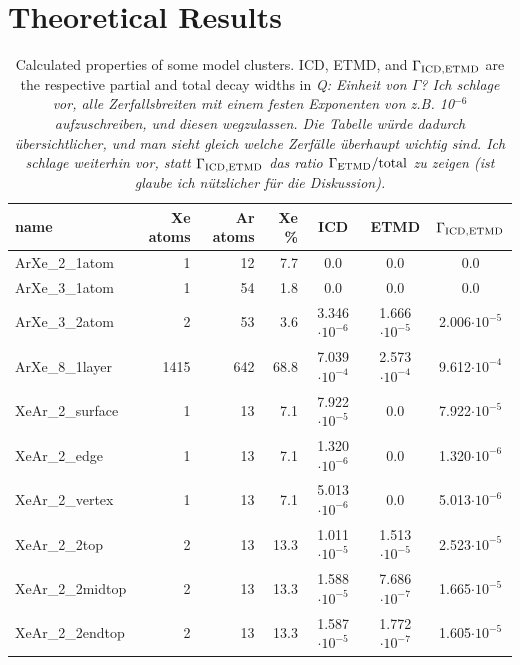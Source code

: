 \section{Theoretical Results}
%
%
\begin{table}[h]
\centering
\caption{Calculated properties of some model clusters. ICD, ETMD, and $\Gamma_{\rm ICD, ETMD}$ are the respective partial and total decay widths in 
{\it Q: Einheit von $\Gamma$? 
Ich schlage vor, alle Zerfallsbreiten mit einem festen Exponenten von z.B. 10$^{-6}$ aufzuschreiben, und diesen wegzulassen. 
Die Tabelle w\"urde dadurch \"ubersichtlicher, und man sieht gleich welche Zerf\"alle \"uberhaupt wichtig sind.
Ich schlage weiterhin vor, statt $\Gamma_{\rm ICD, ETMD}$ das ratio $\Gamma_{\rm ETMD}/\rm total$ zu zeigen (ist glaube ich n\"utzlicher f\"ur die Diskussion).}
}
\begin{tabular}{lrrrccc}
\toprule
name                 & Xe atoms & Ar atoms & Xe \% &   ICD                &  ETMD                & $\Gamma_{\rm ICD,ETMD}$\\
\midrule
ArXe\_2\_1atom       &      1   &     12   &  7.7  &      0.0             &  0.0                 &     0.0            \\
ArXe\_3\_1atom       &      1   &     54   &  1.8  &      0.0             &  0.0                 &     0.0            \\ 
ArXe\_3\_2atom       &      2   &     53   &  3.6  & 3.346$\cdot 10^{-6}$ & 1.666$\cdot 10^{-5}$ & 2.006$\cdot 10^{-5}$ \\
ArXe\_8\_1layer      &   1415   &    642   & 68.8  & 7.039$\cdot 10^{-4}$ & 2.573$\cdot 10^{-4}$ & 9.612$\cdot 10^{-4}$ \\
\midrule
XeAr\_2\_surface     &      1   &     13   &  7.1  & 7.922$\cdot 10^{-5}$ & 0.0                  & 7.922$\cdot 10^{-5}$ \\
XeAr\_2\_edge        &      1   &     13   &  7.1  & 1.320$\cdot 10^{-6}$ & 0.0                  & 1.320$\cdot 10^{-6}$ \\
XeAr\_2\_vertex      &      1   &     13   &  7.1  & 5.013$\cdot 10^{-6}$ & 0.0                  & 5.013$\cdot 10^{-6}$ \\
XeAr\_2\_2top        &      2   &     13   & 13.3  & 1.011$\cdot 10^{-5}$ & 1.513$\cdot 10^{-5}$ & 2.523$\cdot 10^{-5}$ \\
XeAr\_2\_2midtop     &      2   &     13   & 13.3  & 1.588$\cdot 10^{-5}$ & 7.686$\cdot 10^{-7}$ & 1.665$\cdot 10^{-5}$ \\
XeAr\_2\_2endtop     &      2   &     13   & 13.3  & 1.587$\cdot 10^{-5}$ & 1.772$\cdot 10^{-7}$ & 1.605$\cdot 10^{-5}$ \\

\end{tabular}
\end{table}
